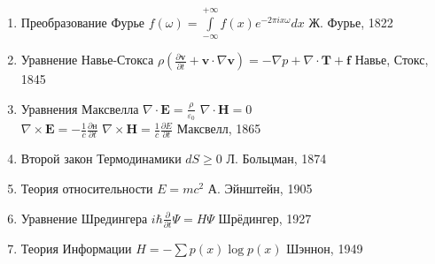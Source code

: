 \documentclass[12pt]{article}
\begin{document}
\begin{enumerate}
\item\begin{minipage}[t]{100mm} 
 Преобразование Фурье                         $f(\omega) = \int \limits_{-\infty}^{+\infty}f(x)e^{-2\pi i x \omega}dx$
\hfill Ж. Фурье, 1822 \end{minipage} 

\item\begin{minipage}[t]{100mm} 
 Уравнение Навье-Стокса                      $\rho \left( \frac{\partial \textbf{v}}{\partial t} +\textbf{v} \cdot \nabla \textbf{v} \right) = -\nabla p + \nabla \cdot \textbf{T} + \textbf{f}$
\hfill Навье, Стокс, 1845 \end{minipage} 

\item\begin{minipage}[t]{100mm} 
 Уравнения Максвелла                           $\nabla \cdot \textbf{E} = \frac \rho{\varepsilon_0}$ \quad $\nabla \cdot \textbf{H} = 0$  \\
                                                                          $\nabla \times \textbf{E} = -\frac1{c} \frac{\partial \textbf{н}}{\partial t}$ \quad $\nabla \times \textbf{H} = \frac 1{c} \frac{\partial E}{\partial t}$
\hfill Максвелл, 1865 \end{minipage} 

\item\begin{minipage}[t]{100mm} 
 Второй закон Термодинамики               $dS \geq 0$
\hfill Л. Больцман, 1874 \end{minipage} 

\item\begin{minipage}[t]{100mm} 
 Теория относительности                       $E = mc^2$
\hfill А. Эйнштейн, 1905 \end{minipage}
 
\item\begin{minipage}[t]{100mm} 
 Уравнение Шредингера                         $i\hbar \frac{\partial}{\partial t}\Psi=H\Psi$
\hfill Шрёдингер, 1927 \end{minipage} 

\item\begin{minipage}[t]{100mm} 
 Теория Информации                                $H = -\sum p(x) {\log p(x)}$
\hfill Шэннон, 1949 \end{minipage} 


\end{enumerate}
\end{document}

